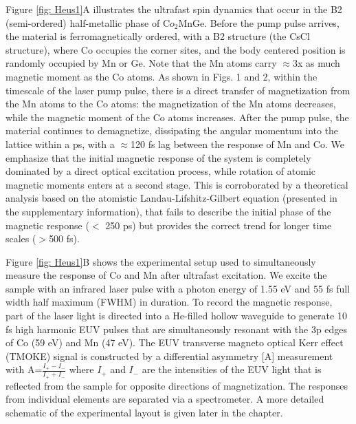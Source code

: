 Figure \ref{fig: Heus1}A illustrates the ultrafast spin dynamics that occur in the B2 (semi-ordered) half-metallic phase of C$o_2$MnGe. Before the pump pulse arrives, the material is ferromagnetically ordered, with a B2 structure (the CsCl structure), where Co occupies the corner sites, and the body centered position is randomly occupied by Mn or Ge. Note that the Mn atoms carry $\approx$3x as much magnetic moment as the Co atoms. As shown in Figs. 1 and 2, within the timescale of the laser pump pulse, there is a direct transfer of magnetization from the Mn atoms to the Co atoms: the magnetization of the Mn atoms decreases, while the magnetic moment of the Co atoms increases. After the pump pulse, the material continues to demagnetize, dissipating the angular momentum into the lattice within a ps, with a $\approx$120 fs lag between the response of Mn and Co. We emphasize that the initial magnetic response of the system is completely dominated by a direct optical excitation process, while rotation of atomic magnetic moments enters at a second stage. This is corroborated by a theoretical analysis based on the atomistic Landau-Lifshitz-Gilbert equation \cite{Ericksson2017} (presented in the supplementary information), that fails to describe the initial phase of the magnetic response ($<$ 250 ps) but provides the correct trend for longer time scales ($>$500 fs).

Figure \ref{fig: Heus1}B shows the experimental setup used to simultaneously measure the response of Co and Mn after ultrafast excitation. We excite the sample with an infrared laser pulse with a photon energy of 1.55 eV and 55 fs full width half maximum (FWHM) in duration. To record the magnetic response, part of the laser light is directed into a He-filled hollow waveguide to generate 10 fs high harmonic EUV pulses that are simultaneously resonant with the 3p edges of Co (59 eV) and Mn (47 eV). The EUV transverse magneto optical Kerr effect (TMOKE) signal is constructed by a differential asymmetry [A] measurement with A=$\frac{I_+ - I_-}{I_+ + I_-}$ where $I_+$ and $I_-$ are the intensities of the EUV light that is reflected from the sample for opposite directions of magnetization. The responses from individual elements are separated via a spectrometer. A more detailed schematic of the experimental layout is given later in the chapter.

